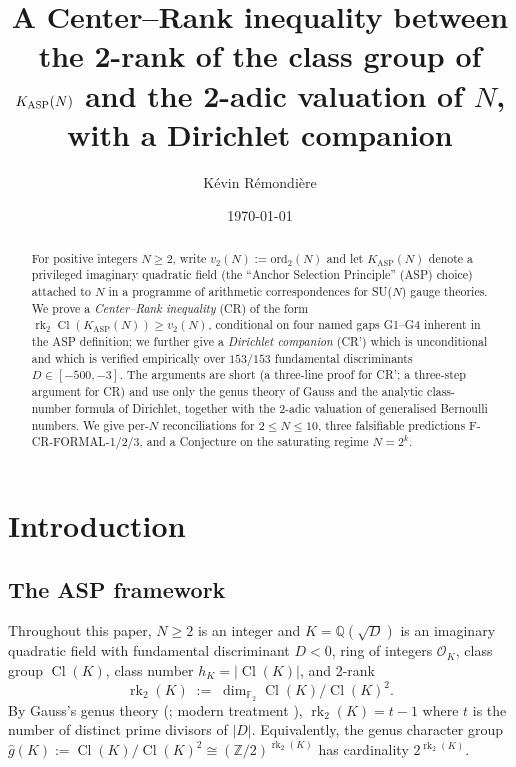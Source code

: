 \documentclass[11pt,a4paper,reqno]{amsart}
\title[Center--Rank and Dirichlet companion]
  {A Center--Rank inequality between the 2-rank of the class group of
   $\KASP(N)$ and the 2-adic valuation of $N$, with a Dirichlet companion}
\author[K.~R\'emondi\`ere]{K\'evin R\'emondi\`ere}
\date{\today}
\theoremstyle{definition}
\DeclareMathOperator{\Cl}{Cl}
\DeclareMathOperator{\rk}{rk}
\newcommand{\OK}{\mathcal{O}_K}
\newcommand{\KASP}{K_{\mathrm{ASP}}}
\newcommand{\ZZ}{\mathbb{Z}}
\newcommand{\QQ}{\mathbb{Q}}
\newcommand{\FF}{\mathbb{F}}
\newcommand{\vtwo}{v_2}
\begin{document}
\begin{abstract}
For positive integers $N \ge 2$, write $\vtwo(N) := \mathrm{ord}_2(N)$ and let
$\KASP(N)$ denote a privileged imaginary quadratic field (the ``Anchor Selection
Principle'' (ASP) choice) attached to $N$ in a programme of arithmetic
correspondences for SU($N$) gauge theories. We prove a \emph{Center--Rank
inequality} (CR) of the form $\rk_2 \Cl(\KASP(N)) \ge \vtwo(N)$, conditional on
four named gaps G1--G4 inherent in the ASP definition; we further give a
\emph{Dirichlet companion} (CR') which is unconditional and which is verified
empirically over $153/153$ fundamental discriminants $D\in[-500,-3]$. The
arguments are short (a three-line proof for CR'; a three-step argument for CR)
and use only the genus theory of Gauss and the analytic class-number formula
of Dirichlet, together with the 2-adic valuation of generalised Bernoulli
numbers. We give per-$N$ reconciliations for $2 \le N \le 10$, three falsifiable
predictions F-CR-FORMAL-1/2/3, and a Conjecture on the saturating regime
$N = 2^k$.
\end{abstract}

\maketitle

\section{Introduction}\label{sec:intro}

\subsection{The ASP framework}
\label{ss:asp}

Throughout this paper, $N\ge 2$ is an integer and $K=\QQ(\sqrt{D})$ is an
imaginary quadratic field with fundamental discriminant $D<0$, ring of
integers $\OK$, class group $\Cl(K)$, class number $h_K=|\Cl(K)|$, and 2-rank
\[
   \rk_2(K) \;:=\; \dim_{\FF_2}\Cl(K)/\Cl(K)^2.
\]
By Gauss's genus theory (\cite[Disquisitiones \S\S 246--262]{Gauss1801}; modern
treatment \cite[Thm.~7.7]{Cox1989}), $\rk_2(K) = t-1$ where $t$ is the number
of distinct prime divisors of $|D|$. Equivalently, the genus character group
$\widehat{g}(K) := \Cl(K)/\Cl(K)^2 \cong (\ZZ/2)^{\rk_2(K)}$ has cardinality
$2^{\rk_2(K)}$.
\end{document}
